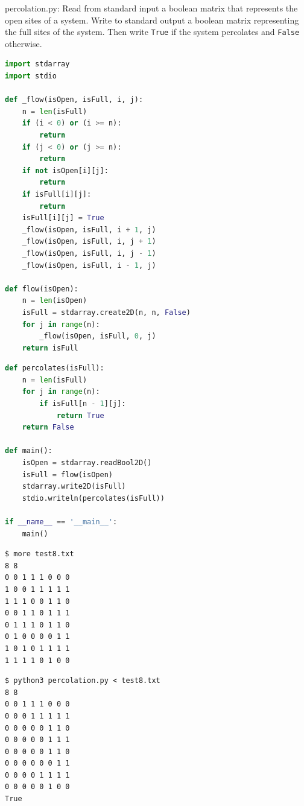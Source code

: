 \documentclass[8pt,a4paper,compress]{beamer}
\begin{document}
\begin{frame}[fragile]
\pause

\begin{framed}
\tiny percolation.py: Read from standard input a boolean matrix that represents the open sites of a system. Write to standard output a boolean matrix representing the full sites of the system. Then write \lstinline{True} if the system percolates and \lstinline{False} otherwise.

\end{framed}

\begin{lstlisting}[language=Python]
import stdarray
import stdio

def _flow(isOpen, isFull, i, j):
    n = len(isFull)
    if (i < 0) or (i >= n):
        return
    if (j < 0) or (j >= n):
        return
    if not isOpen[i][j]:
        return
    if isFull[i][j]:
        return
    isFull[i][j] = True
    _flow(isOpen, isFull, i + 1, j)
    _flow(isOpen, isFull, i, j + 1)
    _flow(isOpen, isFull, i, j - 1)
    _flow(isOpen, isFull, i - 1, j)

def flow(isOpen):
    n = len(isOpen)
    isFull = stdarray.create2D(n, n, False)
    for j in range(n):
        _flow(isOpen, isFull, 0, j)
    return isFull
\end{lstlisting}
\end{frame}

\begin{frame}[fragile]
\pause

\begin{lstlisting}[language=Python]
def percolates(isFull):
    n = len(isFull)
    for j in range(n):
        if isFull[n - 1][j]:
            return True
    return False

def main():
    isOpen = stdarray.readBool2D()
    isFull = flow(isOpen)
    stdarray.write2D(isFull)
    stdio.writeln(percolates(isFull))

if __name__ == '__main__':
    main()
\end{lstlisting}
\end{frame}

\begin{frame}[fragile]
\pause

\begin{lstlisting}[language={}]
$ more test8.txt 
8 8
0 0 1 1 1 0 0 0
1 0 0 1 1 1 1 1
1 1 1 0 0 1 1 0
0 0 1 1 0 1 1 1
0 1 1 1 0 1 1 0
0 1 0 0 0 0 1 1
1 0 1 0 1 1 1 1
1 1 1 1 0 1 0 0
\end{lstlisting}

\pause

\begin{lstlisting}[language={}]
$ python3 percolation.py < test8.txt 
8 8
0 0 1 1 1 0 0 0 
0 0 0 1 1 1 1 1 
0 0 0 0 0 1 1 0 
0 0 0 0 0 1 1 1 
0 0 0 0 0 1 1 0 
0 0 0 0 0 0 1 1 
0 0 0 0 1 1 1 1 
0 0 0 0 0 1 0 0 
True
\end{lstlisting}
\end{frame}
\end{document}
